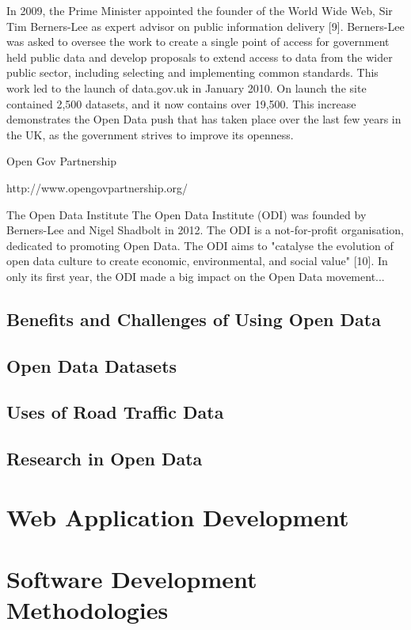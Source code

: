 \documentclass[authoryearcitations]{UoYCSproject}
\begin{document}
In 2009, the Prime Minister appointed the founder of the World Wide Web, Sir Tim Berners-Lee as expert advisor on public information delivery [9]. Berners-Lee was asked to oversee the work to create a single point of access for government held public data and develop proposals to extend access to data from the wider public sector, including selecting and implementing common standards. This work led to the launch of data.gov.uk in January 2010. On launch the site contained 2,500 datasets, and it now contains over 19,500. This increase demonstrates the Open Data push that has taken place over the last few years in the UK, as the government strives to improve its openness. 

Open Gov Partnership

http://www.opengovpartnership.org/

The Open Data Institute
The Open Data Institute (ODI) was founded by Berners-Lee and Nigel Shadbolt in 2012. The ODI is a not-for-profit organisation, dedicated to promoting Open Data. The ODI aims to "catalyse the evolution of open data culture to create economic, environmental, and social value" [10]. In only its first year, the ODI made a big impact on the Open Data movement...

\subsection{Benefits and Challenges of Using Open Data}

\subsection{Open Data Datasets}

\subsection{Uses of Road Traffic Data}

\subsection{Research in Open Data}

\section{Web Application Development}

\section{Software Development Methodologies}
\end{document}
